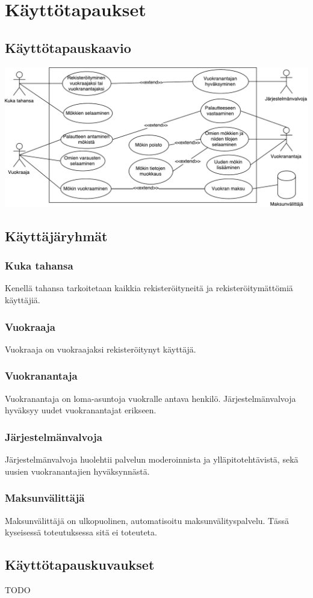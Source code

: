 \chapter{Käyttötapaukset}

\section{Käyttötapauskaavio}
\includegraphics[width = 14cm]{./diagrams/drawio_usecase.pdf}

\section{Käyttäjäryhmät}

\subsection*{Kuka tahansa}
Kenellä tahansa tarkoitetaan kaikkia rekisteröityneitä ja rekisteröitymättömiä käyttäjiä.

\subsection*{Vuokraaja}
Vuokraaja on vuokraajaksi rekisteröitynyt käyttäjä.

\subsection*{Vuokranantaja}
Vuokranantaja on loma-asuntoja vuokralle antava henkilö. Järjestelmänvalvoja hyväksyy uudet vuokranantajat erikseen.

\subsection*{Järjestelmänvalvoja}
Järjestelmänvalvoja huolehtii palvelun moderoinnista ja ylläpitotehtävistä, sekä uusien vuokranantajien hyväksynnästä.

\subsection*{Maksunvälittäjä}
Maksunvälittäjä on ulkopuolinen, automatisoitu maksunvälityspalvelu. Tässä kyseisessä toteutuksessa sitä ei toteuteta.

\section*{Käyttötapauskuvaukset}
TODO